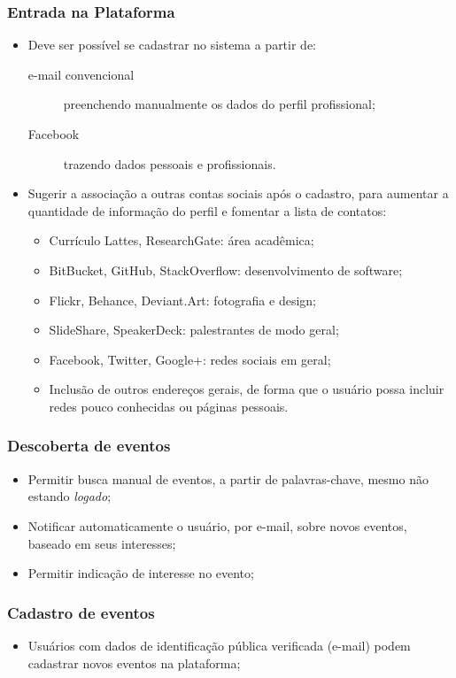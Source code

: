 \documentclass[12pt,a4paper,twoside,hyphens,english,brazil]{abntex2}
\begin{document}
\subsubsection*{Entrada na Plataforma}
\begin{itemize}
\item Deve ser possível se cadastrar no sistema a partir de:
	\begin{description}
		\item[e-mail convencional] preenchendo manualmente os dados do perfil profissional;
		\item[Facebook] trazendo dados pessoais e profissionais.
	\end{description}
\item Sugerir a associação a outras contas sociais após o cadastro, para aumentar a quantidade de informação do perfil e fomentar a lista de contatos:
	\begin{itemize}[itemsep=-1ex]
		\item Currículo Lattes, ResearchGate: área acadêmica;
		\item BitBucket, GitHub, StackOverflow: desenvolvimento de software;
		\item Flickr, Behance, Deviant.Art: fotografia e design;
		\item SlideShare, SpeakerDeck: palestrantes de modo geral;
		\item Facebook, Twitter, Google+: redes sociais em geral;
		\item Inclusão de outros endereços gerais, de forma que o usuário possa incluir redes pouco conhecidas ou páginas pessoais.
	\end{itemize}
\end{itemize}

\subsubsection*{Descoberta de eventos}
\begin{itemize}
	\item Permitir busca manual de eventos, a partir de palavras-chave, mesmo não estando \textit{logado};
	\item Notificar automaticamente o usuário, por e-mail, sobre novos eventos, baseado em seus interesses;
	\item Permitir indicação de interesse no evento;
\end{itemize}

\subsubsection*{Cadastro de eventos}
\begin{itemize}
	\item Usuários com dados de identificação pública verificada (e-mail) podem cadastrar novos eventos na plataforma;
\end{itemize}
\end{document}
